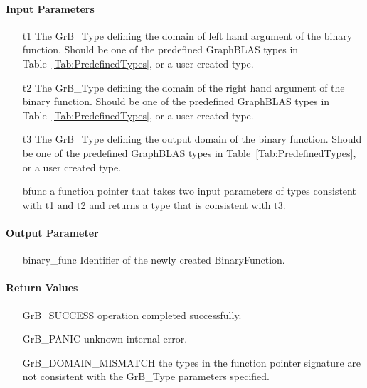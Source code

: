 \paragraph{Input Parameters}

\begin{itemize}[leftmargin=1.1in]
    \item[{\sf t1}] The {\sf GrB\_Type} defining the domain of left hand argument of
    the binary function. Should be one of the predefined
    GraphBLAS types in Table~\ref{Tab:PredefinedTypes}, or a user created type.
    \item[{\sf t2}] The {\sf GrB\_Type} defining the domain of the right hand argument of
    the binary function. Should be one of the predefined
    GraphBLAS types in Table~\ref{Tab:PredefinedTypes}, or a user created type.
    \item[{\sf t3}] The {\sf GrB\_Type} defining the output domain of the binary
    function. Should be one of the predefined
    GraphBLAS types in Table~\ref{Tab:PredefinedTypes}, or a user created type.
    \item[{\sf bfunc}] a function pointer that takes two input parameters of types consistent
    with t1 and t2 and returns a type that is consistent with t3.
\end{itemize}

\paragraph{Output Parameter}

\begin{itemize}[leftmargin=1.1in]
    \item[{\sf binary\_func}] Identifier of the newly created BinaryFunction.
\end{itemize}

\paragraph{Return Values}

\begin{itemize}[leftmargin=2.1in]
\item[{\sf GrB\_SUCCESS}]           operation completed successfully.
\item[{\sf GrB\_PANIC}]             unknown internal error.
\item[{\sf GrB\_DOMAIN\_MISMATCH}]  the types in the function pointer signature are not   
                                    consistent with the {\sf GrB\_Type} parameters specified.
\end{itemize}

